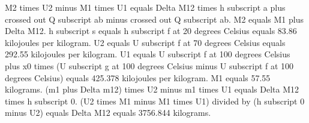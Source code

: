 M2 times U2 minus M1 times U1 equals Delta M12 times h subscript a plus crossed out Q subscript ab minus crossed out Q subscript ab.
M2 equals M1 plus Delta M12.
h subscript s equals h subscript f at 20 degrees Celsius equals 83.86 kilojoules per kilogram.
U2 equals U subscript f at 70 degrees Celsius equals 292.55 kilojoules per kilogram.
U1 equals U subscript f at 100 degrees Celsius plus x0 times (U subscript g at 100 degrees Celsius minus U subscript f at 100 degrees Celsius) equals 425.378 kilojoules per kilogram.
M1 equals 57.55 kilograms.
(m1 plus Delta m12) times U2 minus m1 times U1 equals Delta M12 times h subscript 0.
(U2 times M1 minus M1 times U1) divided by (h subscript 0 minus U2) equals Delta M12 equals 3756.844 kilograms.